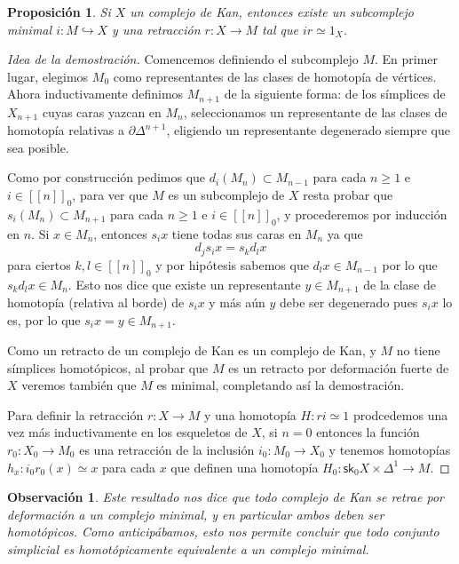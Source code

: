 \documentclass[11pt]{report}
\theoremstyle{colored}
\newtheorem{proposition}{Proposición}[section]
\newtheorem{remark}{Observación}[section]
\newcommand{\nat}[1]{[\![#1]\!]}
\newcommand{\natzero}[1]{\nat{#1}_0}
\newcommand{\sk}{\mathsf{sk}}
\renewcommand{\ss}[1]{\Delta^{#1}}
\begin{document}
\begin{proposition} Si $X$ un complejo de Kan, entonces existe un subcomplejo minimal $i : M \hookrightarrow X$ y una retracción $r : X \to M$ tal que $ir \simeq 1_X$. 
\end{proposition}
\begin{proof}[Idea de la demostración] Comencemos definiendo el subcomplejo $M$. En primer lugar, elegimos $M_0$ como representantes de las clases de homotopía de vértices. Ahora inductivamente definimos $M_{n+1}$ de la siguiente forma: de los símplices de $X_{n+1}$ cuyas caras yazcan en $M_n$, seleccionamos un representante de las clases de homotopía relativas a $\partial\ss{n+1}$, eligiendo un representante degenerado siempre que sea posible.

Como por construcción pedimos que $d_i(M_n) \subset M_{n-1}$ para cada $n \geq 1$ e $i \in \natzero{n}$, para ver que $M$ es un subcomplejo de $X$ resta probar que $s_i(M_n) \subset M_{n+1}$ para cada $n \geq 1$ e $i \in \natzero{n}$, y procederemos por inducción en $n$. Si $x \in M_n$, entonces $s_ix$ tiene todas sus caras en $M_n$ ya que
\[
d_js_ix = s_kd_lx
\]
para ciertos $k,l \in \natzero{n}$ y por hipótesis sabemos que $d_l x \in M_{n-1}$ por lo que $s_kd_l x \in M_n$. Esto nos dice que existe un representante $y \in M_{n+1}$ de la clase de homotopía (relativa al borde) de $s_ix$ y más aún $y$ debe ser degenerado pues $s_ix$ lo es, por lo que $s_ix = y \in M_{n+1}$.  

Como un retracto de un complejo de Kan es un complejo de Kan, y $M$ no tiene símplices homotópicos, al probar que $M$ es un retracto por deformación fuerte de $X$ veremos también que $M$ es minimal, completando así la demostración. 

Para definir la retracción $r : X \to M$ y una homotopía $H : ri \simeq 1$ prodcedemos una vez más inductivamente en los esqueletos de $X$, si $n = 0$ entonces la función $r_0 : X_0 \to M_0$ es una retracción de la inclusión $i_0 : M_0 \to X_0$ y tenemos homotopías $h_x : i_0r_0(x) \simeq x$ para cada $x$ que definen una homotopía $H_0 : \sk_0 X \times \ss{1} \to M$. 
\end{proof}

\begin{remark} Este resultado nos dice que todo complejo de Kan se retrae por deformación a un complejo minimal, y en particular ambos deben ser homotópicos. Como anticipábamos, esto nos permite concluir que todo conjunto simplicial es homotópicamente equivalente a un complejo minimal.
\end{remark}
\end{document}
